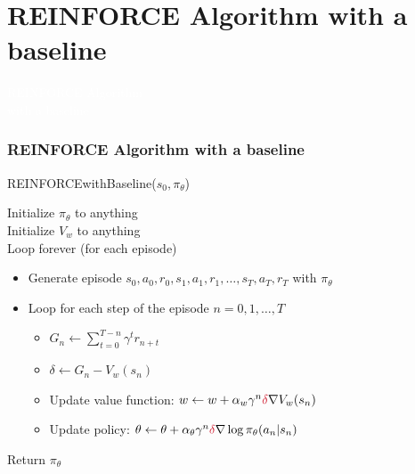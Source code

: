 \documentclass[11pt,table]{beamer}
\begin{document}
\section{REINFORCE Algorithm with a baseline}
{
\begin{frame}
\centering
\Huge
\textcolor{white}{REINFORCE Algorithm\\ with a baseline}
\thispagestyle{empty}
\end{frame}
}

\begin{frame}
\frametitle{REINFORCE Algorithm with a baseline}

\begin{tcolorbox}[colframe=black, boxrule=1pt, sharp corners]

\textcolor{red1}{REINFORCEwithBaseline(\( s_0, \pi_\theta \))}

Initialize \( \pi_\theta \) to anything\\
Initialize \( V_w \) to anything\\
Loop forever (for each episode)
\begin{itemize}
    \item[] Generate episode \( s_0, a_0, r_0, s_1, a_1, r_1, \dots, s_T, a_T, r_T \) with \( \pi_\theta \)
    \item[] Loop for each step of the episode \( n = 0, 1, \dots, T \)
    \begin{itemize}
        \item[] \( G_n \leftarrow \sum_{t=0}^{T-n} \gamma^{t} r_{n+t} \)
        \item[] \textcolor{red1}{\( \delta \leftarrow G_n - V_w(s_n) \)}
        \item[] Update value function: \( w \leftarrow w + \alpha_w \gamma^n \textcolor{red1}{\delta} \nabla V_w(s_n) \)
        \item[] Update policy: \( \theta \leftarrow \theta + \alpha_\theta \gamma^n \textcolor{red1}{\delta} \nabla \log \pi_\theta(a_n|s_n) \)
    \end{itemize}
\end{itemize}

Return \( \pi_\theta \)

\end{tcolorbox}

\end{frame}
\end{document}
